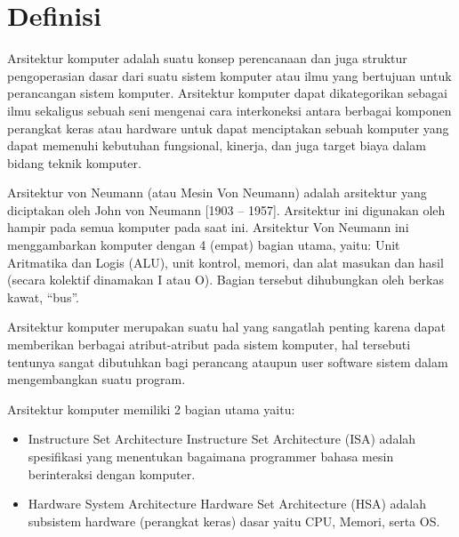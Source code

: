 \section{Definisi}

Arsitektur komputer adalah suatu konsep perencanaan dan juga struktur pengoperasian dasar dari suatu sistem komputer atau ilmu yang bertujuan untuk perancangan sistem komputer. Arsitektur komputer dapat dikategorikan sebagai ilmu sekaligus sebuah seni mengenai cara interkoneksi antara berbagai komponen perangkat keras atau hardware untuk dapat menciptakan sebuah komputer yang dapat memenuhi kebutuhan fungsional, kinerja, dan juga target biaya dalam bidang teknik komputer. 

Arsitektur  von Neumann (atau Mesin Von Neumann) adalah arsitektur yang diciptakan oleh John von Neumann [1903 – 1957]. Arsitektur ini digunakan oleh hampir pada semua komputer pada saat ini. Arsitektur Von Neumann ini menggambarkan komputer dengan 4 (empat) bagian utama, yaitu: Unit Aritmatika dan Logis (ALU), unit kontrol, memori, dan alat masukan dan hasil (secara kolektif dinamakan I atau O). Bagian tersebut dihubungkan oleh berkas kawat, “bus”. 

Arsitektur komputer merupakan suatu hal yang sangatlah penting karena dapat memberikan berbagai atribut-atribut pada sistem komputer, hal tersebuti tentunya sangat dibutuhkan bagi perancang ataupun user software sistem dalam mengembangkan suatu program.

Arsitektur komputer memiliki 2 bagian utama yaitu:
\begin{itemize}
\item Instructure Set Architecture
Instructure Set Architecture (ISA) adalah spesifikasi yang menentukan bagaimana programmer bahasa mesin berinteraksi dengan komputer.
\item Hardware System Architecture
Hardware Set Architecture (HSA) adalah subsistem hardware (perangkat keras) dasar yaitu CPU, Memori, serta OS.

\end{itemize}



